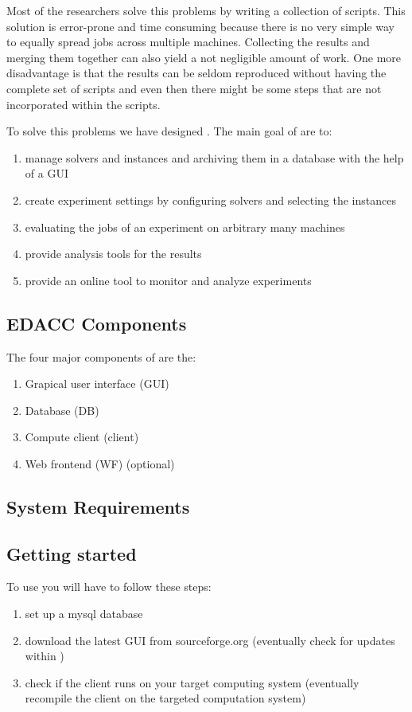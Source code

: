 Most of the researchers solve this problems by writing a collection of scripts. This solution is error-prone and time consuming because there is no very simple way to equally spread jobs across multiple machines. Collecting the results and merging them together can also yield a not negligible amount of work. 
One more disadvantage is that the results can be seldom reproduced without having the complete set of scripts and even then there might be some steps that are not incorporated within the scripts. 

To solve this problems we have designed \edacc. The main goal of \edacc are to: 
\begin{enumerate}
	\item manage solvers and instances and archiving them in a database with the help of a GUI
	\item create experiment settings by configuring solvers and selecting the instances
	\item evaluating the jobs of an experiment on arbitrary many machines
	\item provide analysis tools for the results
	\item provide an online tool to monitor and analyze experiments
\end{enumerate}

\subsection{EDACC Components}

The four major components of \edacc are the:
\begin{enumerate}
	\item Grapical user interface (GUI) 
	\item Database (DB)
	\item Compute client (client) 
	\item Web frontend (WF) (optional)
\end{enumerate}

\subsection{System Requirements}


\subsection{Getting started}
To use \edacc you will have to follow these steps: 
\begin{enumerate}
	\item set up a mysql database
	\item download the latest \edacc GUI from sourceforge.org (eventually check for updates within \edacc)
	\item check if the client runs on your target computing system (eventually recompile the client on the targeted computation system)
\end{enumerate}
	
